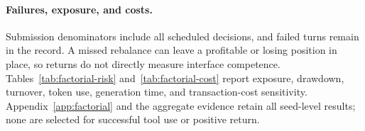 \paragraph{Failures, exposure, and costs.}
Submission denominators include all scheduled decisions, and failed turns remain in the
record. A missed rebalance can leave a profitable or losing position in place, so returns
do not directly measure interface competence. Tables~\ref{tab:factorial-risk}
and~\ref{tab:factorial-cost} report exposure, drawdown, turnover, token use, generation time,
and transaction-cost sensitivity. Appendix~\ref{app:factorial} and the aggregate evidence
retain all seed-level results; none are selected for successful tool use or positive return.
